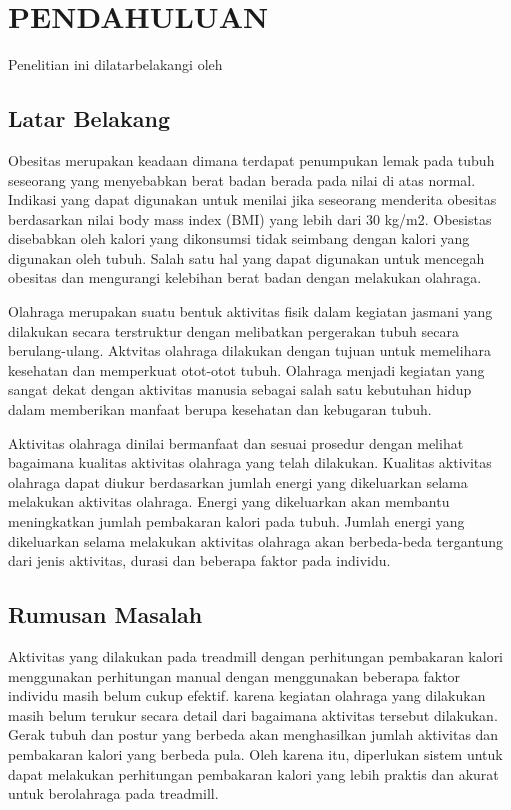 \chapter{PENDAHULUAN}
\label{chap:pendahuluan}


Penelitian ini dilatarbelakangi oleh \lipsum[1][1-5]

\section{Latar Belakang}
\label{sec:latarbelakang}

Obesitas merupakan keadaan dimana terdapat penumpukan lemak pada tubuh seseorang yang menyebabkan berat badan berada pada nilai di atas normal. Indikasi yang dapat digunakan untuk menilai jika seseorang menderita obesitas berdasarkan nilai body mass index (BMI) yang lebih dari 30 kg/m2. Obesistas disebabkan oleh kalori yang dikonsumsi tidak seimbang dengan kalori yang digunakan oleh tubuh. Salah satu hal yang dapat digunakan untuk mencegah obesitas dan mengurangi kelebihan berat badan dengan melakukan olahraga. 

Olahraga merupakan suatu bentuk aktivitas fisik dalam kegiatan jasmani yang dilakukan secara terstruktur dengan melibatkan pergerakan tubuh secara berulang-ulang. Aktvitas olahraga dilakukan dengan tujuan untuk memelihara kesehatan dan memperkuat otot-otot tubuh. Olahraga menjadi kegiatan yang sangat dekat dengan aktivitas manusia sebagai salah satu kebutuhan hidup dalam memberikan manfaat berupa kesehatan dan kebugaran tubuh.

Aktivitas olahraga dinilai bermanfaat dan sesuai prosedur dengan melihat bagaimana kualitas aktivitas olahraga yang telah dilakukan. Kualitas aktivitas olahraga dapat diukur berdasarkan jumlah energi yang dikeluarkan selama melakukan aktivitas olahraga. Energi yang dikeluarkan akan membantu meningkatkan jumlah pembakaran kalori pada tubuh. Jumlah energi yang dikeluarkan selama melakukan aktivitas olahraga akan berbeda-beda tergantung dari jenis aktivitas, durasi dan beberapa faktor pada individu.

\section{Rumusan Masalah}
\label{sec:permasalahan}

Aktivitas yang dilakukan pada treadmill dengan perhitungan pembakaran kalori menggunakan perhitungan manual dengan menggunakan beberapa faktor individu masih belum cukup efektif. karena kegiatan olahraga yang dilakukan masih belum terukur secara detail dari bagaimana aktivitas tersebut dilakukan. Gerak tubuh dan postur yang berbeda akan menghasilkan jumlah aktivitas dan pembakaran kalori yang berbeda pula. Oleh karena itu, diperlukan sistem untuk dapat melakukan perhitungan pembakaran kalori yang lebih praktis dan akurat untuk berolahraga pada treadmill.

